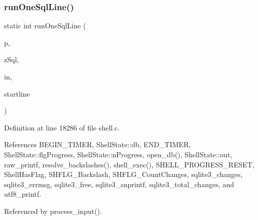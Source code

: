 \subsubsection{run\+One\+Sql\+Line()}
{\footnotesize\ttfamily static int run\+One\+Sql\+Line (\begin{DoxyParamCaption}\item[{\textbf{ Shell\+State} $\ast$}]{p,  }\item[{char $\ast$}]{z\+Sql,  }\item[{F\+I\+LE $\ast$}]{in,  }\item[{int}]{startline }\end{DoxyParamCaption})\hspace{0.3cm}{\ttfamily [static]}}



Definition at line 18286 of file shell.\+c.



References B\+E\+G\+I\+N\+\_\+\+T\+I\+M\+ER, Shell\+State\+::db, E\+N\+D\+\_\+\+T\+I\+M\+ER, Shell\+State\+::flg\+Progress, Shell\+State\+::n\+Progress, open\+\_\+db(), Shell\+State\+::out, raw\+\_\+printf, resolve\+\_\+backslashes(), shell\+\_\+exec(), S\+H\+E\+L\+L\+\_\+\+P\+R\+O\+G\+R\+E\+S\+S\+\_\+\+R\+E\+S\+ET, Shell\+Has\+Flag, S\+H\+F\+L\+G\+\_\+\+Backslash, S\+H\+F\+L\+G\+\_\+\+Count\+Changes, sqlite3\+\_\+changes, sqlite3\+\_\+errmsg, sqlite3\+\_\+free, sqlite3\+\_\+snprintf, sqlite3\+\_\+total\+\_\+changes, and utf8\+\_\+printf.



Referenced by process\+\_\+input().


